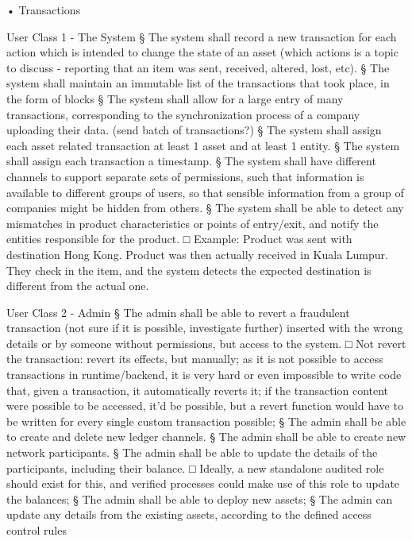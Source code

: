 	• Transactions
		\par User Class 1 - The System
			§ The system shall record a new transaction for each action which is intended to change the state of an asset (which actions is a topic to discuss - reporting that an item was sent, received, altered, lost, etc).
			§ The system shall maintain an immutable list of the transactions that took place, in the form of blocks
			§ The system shall allow for a large entry of many transactions, corresponding to the synchronization process of a company uploading their data. (send batch of transactions?)
			§ The system shall assign each asset related transaction at least 1 asset and  at least 1 entity.
			§ The system shall assign each transaction a timestamp.
			§ The system shall have different channels to support separate sets of permissions, such that information is available to different groups of users, so that sensible information from a group of companies might be hidden from others.
			§ The system shall be able to detect any mismatches in product characteristics or points of entry/exit, and notify the entities responsible for the product.
				□ Example: Product was sent with destination Hong Kong. Product was then actually received in Kuala Lumpur. They check in the item, and the system detects the expected destination is different from the actual one.
		
		\par User Class 2 - Admin
			§ The admin shall be able to revert a fraudulent transaction (not sure if it is possible, investigate further) inserted with the wrong details or by someone without permissions, but access to the system.
				□ Not revert the transaction: revert its effects, but manually; as it is not possible to access transactions in runtime/backend, it is very hard or even impossible to write code that, given a transaction, it automatically reverts it; if the transaction content were possible to be accessed, it'd be possible, but a revert function would have to be written for every single custom transaction possible;
			§ The admin shall be able to create and delete new ledger channels.
			§ The admin shall be able to create new network participants.
			§ The admin shall be able to update the details of the participants, including their balance.
				□ Ideally, a new standalone audited role should exist for this, and verified processes could make use of this role to update the balances;
			§ The admin shall be able to deploy new assets;
			§ The admin can update any details from the existing assets, according to the defined access control rules
		
